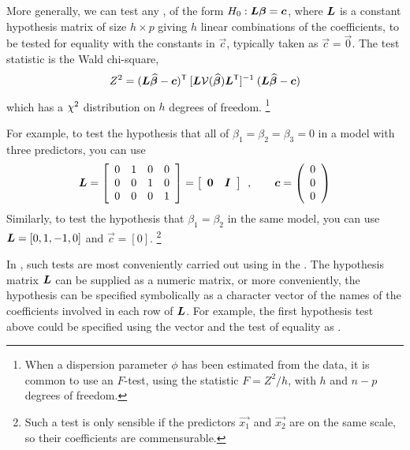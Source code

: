 \documentclass[11pt]{book}\usepackage[]{graphicx}\usepackage[]{color}
\begin{document}
More generally, we can test any , of the form
$H_0 : \bm{L} \bm{\beta} = \bm{c}$, where $\bm{L}$ is a constant hypothesis matrix
of size $h \times p$ giving $h$ linear combinations of the coefficients,
to be tested for equality with the constants in $\vec{c}$, typically taken as $\vec{c}=\vec{0}$.
The test statistic is the Wald chi-square,
\begin{equation}\label{eq:waldchisq}
Z^2 = (\bm{L} \widehat{\bm{\beta}} - \bm{c})^\mathsf{T} \:
      [\bm{L} \mathcal{V} (\widehat{\bm{\beta}}) \bm{L}^\mathsf{T}]^{-1} \:
      (\bm{L} \widehat{\bm{\beta}} - \bm{c})
\end{equation}
which has a $\chi^2$ distribution on $h$ degrees of freedom.%
\footnote{When a dispersion parameter $\phi$ has been estimated from the data,
it is common to use an $F$-test, using the statistic $F = Z^2 / h$,
with $h$ and $n-p$ degrees of freedom.}

For example, to test the hypothesis
that all of
$\beta_1 = \beta_2 = \beta_3 =0$ in a model with three predictors, you can use
\begin{equation*}
\mat{L} = \left[
{\begin{array}{*{20}{c}}
0 & 1 & 0 & 0\\
0 & 0 & 1 & 0\\
0 & 0 & 0 &1
\end{array}}
\right] =
\left[
{\begin{array}{*{20}{c}}
{\vec{0}} & {\mat{I}}
\end{array}}
\right]
\comma
\quad\quad
\vec{c} = \left(
{\begin{array}{*{20}{c}}
0\\
0\\
0
\end{array}}
\right)
\end{equation*}
Similarly, to test the hypothesis that $\beta_1 = \beta_2$ in the same model,
you can use $\bm{L} = [0, 1, -1, 0]$ and $\vec{c} = [0]$.%
\footnote{Such a test is only sensible if the predictors $\vec{x_1}$ and $\vec{x_2}$
are on the same scale, so their coefficients are commensurable.}

In \R, such tests are most conveniently carried out using 
in the .  The hypothesis matrix $\bm{L}$ can be supplied as a
numeric matrix, or more conveniently,
the hypothesis can be specified symbolically as a character vector
of the names of the coefficients involved in each row of $\bm{L}$.
For example, the first hypothesis test above could be specified using the vector
 and the test of equality as
.
\end{document}

